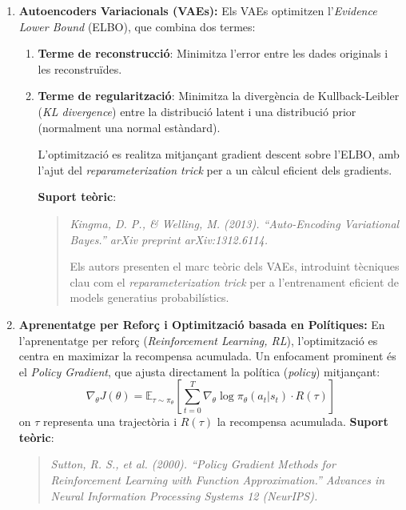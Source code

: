 \begin{enumerate}
\begin{enumerate}
\begin{enumerate}
           \item \textbf{Autoencoders Variacionals (VAEs):} Els VAEs optimitzen l'\textit{Evidence Lower Bound} (ELBO), que combina dos termes:
               \begin{enumerate}
                \item \textbf{Terme de reconstrucció}: Minimitza l'error entre les dades originals i les reconstruïdes.

                \item \textbf{Terme de regularització}: Minimitza la divergència de Kullback-Leibler (\textit{KL divergence}) entre la distribució latent i una distribució prior (normalment una normal estàndard).

                L'optimització es realitza mitjançant gradient descent sobre l'ELBO, amb l'ajut del \textit{reparameterization trick} per a un càlcul eficient dels gradients.

                \textbf{Suport teòric}:
                \begin{quote}
                \textit{Kingma, D. P., \& Welling, M. (2013). ``Auto-Encoding Variational Bayes.'' arXiv preprint arXiv:1312.6114.}

                Els autors presenten el marc teòric dels VAEs, introduint tècniques clau com el \textit{reparameterization trick} per a l'entrenament eficient de models generatius probabilístics.
                \end{quote}
               \end{enumerate}
           \item \textbf{Aprenentatge per Reforç i Optimització basada en Polítiques:} En l'aprenentatge per reforç (\textit{Reinforcement Learning, RL}), l'optimització es centra en maximizar la recompensa acumulada. Un enfocament prominent és el \textit{Policy Gradient}, que ajusta directament la política (\textit{policy}) mitjançant:
           \[ \nabla_\theta J(\theta) = \mathbb{E}_{\tau \sim \pi_\theta} \left[ \sum_{t=0}^T \nabla_\theta \log \pi_\theta(a_t|s_t) \cdot R(\tau) \right] \]
           on $\tau$ representa una trajectòria i $R(\tau)$ la recompensa acumulada.
           \textbf{Suport teòric}:
           \begin{quote}
           \textit{Sutton, R. S., et al. (2000). ``Policy Gradient Methods for Reinforcement Learning with Function Approximation.'' Advances in Neural Information Processing Systems 12 (NeurIPS).}


\end{quote}
\end{enumerate}
\end{enumerate}
\end{enumerate}
